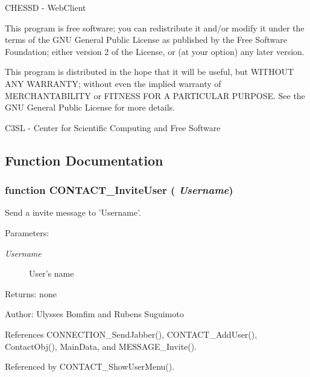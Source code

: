 CHESSD - WebClient

This program is free software; you can redistribute it and/or modify it under the terms of the GNU General Public License as published by the Free Software Foundation; either version 2 of the License, or (at your option) any later version.

This program is distributed in the hope that it will be useful, but WITHOUT ANY WARRANTY; without even the implied warranty of MERCHANTABILITY or FITNESS FOR A PARTICULAR PURPOSE. See the GNU General Public License for more details.

C3SL - Center for Scientific Computing and Free Software 

\subsection{Function Documentation}
\subsubsection[CONTACT\_\-InviteUser]{\setlength{\rightskip}{0pt plus 5cm}function CONTACT\_\-InviteUser ( {\em Username})}\label{invite_8js_87665c122ac1865b648f6c897cdaa6ab}


Send a invite message to 'Username'. 

\begin{Desc}
\item[Parameters:]
\begin{description}
\item[{\em Username}]User's name \end{description}
\end{Desc}
\begin{Desc}
\item[Returns:]none \end{Desc}
\begin{Desc}
\item[Author:]Ulysses Bomfim and Rubens Suguimoto \end{Desc}


References CONNECTION\_\-SendJabber(), CONTACT\_\-AddUser(), ContactObj(), MainData, and MESSAGE\_\-Invite().

Referenced by CONTACT\_\-ShowUserMenu().

